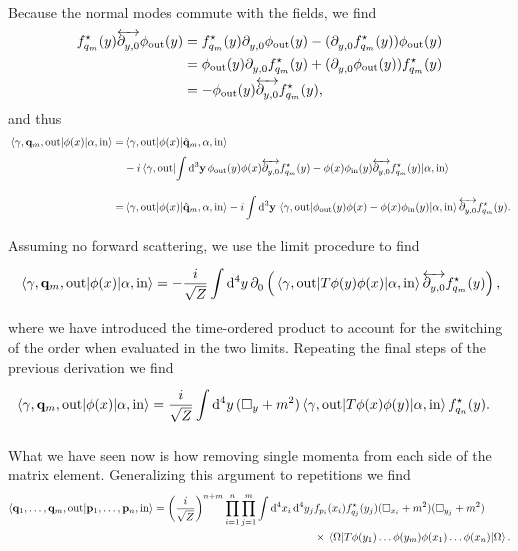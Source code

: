 Because the normal modes commute with the fields, we find
\begin{align*}
	f_{q_{m}}^{\star}(y)\overleftrightarrow{\partial^{}_{y, 0}}\phi_{\text{out}}(y) &= f_{q_{m}}^{\star}(y)\partial^{}_{y, 0}\phi_{\text{out}}(y) - (\partial^{}_{y, 0}f_{q_{m}}^{\star}(y))\phi_{\text{out}}(y) \\
	                                                  &= \phi_{\text{out}}(y)\partial^{}_{y, 0}f_{q_{m}}^{\star}(y) + (\partial^{}_{y, 0}\phi_{\text{out}}(y))f_{q_{m}}^{\star}(y) \\
	                                                  &= -\phi_{\text{out}}(y)\overleftrightarrow{\partial^{}_{y, 0}}f_{q_{m}}^{\star}(y),
\end{align*}
and thus
\begin{align*}
	\mel{\gamma, \vb{q}_{m}, \text{out}}{\phi(x)}{\alpha, \text{in}} =& \mel{\gamma, \text{out}}{\phi(x)}{\hat{\vb{q}}_{m}, \alpha, \text{in}} \\
	&- i\mel{\gamma, \text{out}}{\int\limits_{}^{}\dd[3]{\vb{y}}\phi_{\text{out}}(y)\phi(x)\ensuremath{\overleftrightarrow{\partial^{}_{y, 0}}}f_{q_{m}}\ensuremath{^{\star}}(y) - \phi(x)\phi_{\text{in}}(y)\ensuremath{\overleftrightarrow{\partial^{}_{y, 0}}}f_{q_{m}}\ensuremath{^{\star}}(y)}{\alpha, \text{in}} \\
	=& \mel{\gamma, \text{out}}{\phi(x)}{\hat{\vb{q}}_{m}, \alpha, \text{in}} - i\int\limits_{}^{}\dd[3]{\vb{y}}\mel{\gamma, \text{out}}{\phi_{\text{out}}(y)\phi(x) - \phi(x)\phi_{\text{in}}(y)}{\alpha, \text{in}}\overleftrightarrow{\partial^{}_{y, 0}}f_{q_{m}}^{\star}(y).
\end{align*}
Assuming no forward scattering, we use the limit procedure to find
\begin{align*}
	\mel{\gamma, \vb{q}_{m}, \text{out}}{\phi(x)}{\alpha, \text{in}} = - \frac{i}{\sqrt{Z}}\int\limits_{}^{}\dd[4]{y}\partial^{}_{0}\left(\mel{\gamma, \text{out}}{\ensuremath{T}\phi(y)\phi(x)}{\alpha, \text{in}}\overleftrightarrow{\partial^{}_{y, 0}}f_{q_{m}}^{\star}(y)\right),
\end{align*}
where we have introduced the time-ordered product to account for the switching of the order when evaluated in the two limits. Repeating the final steps of the previous derivation we find
\begin{align*}
	\mel{\gamma, \vb{q}_{m}, \text{out}}{\phi(x)}{\alpha, \text{in}} &= \frac{i}{\sqrt{Z}}\int\limits_{}^{}\dd[4]{y}(\square _{y} + m^{2})\mel{\gamma, \text{out}}{\ensuremath{T}{\phi(x)}{\phi(y)}}{\alpha, \text{in}}f_{q_{n}}^{\star}(y).
\end{align*}

What we have seen now is how removing single momenta from each side of the matrix element. Generalizing this argument to repetitions we find
\begin{align*}
	\braket{\vb{q}_{1}, \dots, \vb{q}_{m}, \text{out}}{\vb{p}_{1}, \dots, \vb{p}_{n}, \text{in}} = \left(\frac{i}{\sqrt{Z}}\right)^{n + m}\prod\limits_{i = 1}^{n}\prod\limits_{j = 1}^{m}\int\dd[4]{x_{i}}\dd[4]{y_{j}}&f_{p_{i}}(x_{i})f_{q_{j}}^{\star}(y_{j})(\square _{x_{i}} + m^{2})(\square _{y_{j}} + m^{2}) \\
	&\times\expval{\ensuremath{T}{\phi(y_{1})\dots\phi(y_{m})}{\phi(x_{1})\dots\phi(x_{n})}}{\Omega}.
\end{align*}

